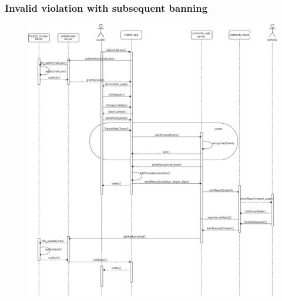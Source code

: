 \documentclass[12pt,a4paper]{article}
\begin{document}
		\subsubsection{Invalid violation with subsequent banning}
			\begin{figure}[H]
\begin{adjustwidth}{-25mm}{-25mm}
				\centering
				\includegraphics[width=.8\paperwidth,height=.8\paperheight,keepaspectratio]{Images/invalidation_banning}
\end{adjustwidth}
			\end{figure}
\end{document}
